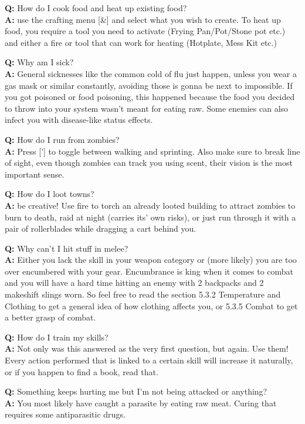 \documentclass[11pt]{report}
\begin{document}
\textbf{Q:} How do I cook food and heat up existing food?\\
\textbf{A:} use the crafting menu [\&] and select what you wish to create. To heat up food, you require a tool you need to activate (Frying Pan/Pot/Stone pot etc.) and either a fire or tool that can work for heating (Hotplate, Mess Kit etc.)

\textbf{Q:} Why am I sick?\\
\textbf{A:} General sicknesses like the common cold of flu just happen, unless you wear a gas mask or similar constantly, avoiding those is gonna be next to impossible. If you got poisoned or food poisoning, this happened because the food you decided to throw into your system wasn't meant for eating raw. Some enemies can also infect you with disease-like status effects.

\textbf{Q:} How do I run from zombies?\\
\textbf{A:} Press ['] to toggle between walking and sprinting. Also make sure to break line of sight, even though zombies can track you using scent, their vision is the most important sense.

\textbf{Q:} How do I loot towns?\\
\textbf{A:} be creative! Use fire to torch an already looted building to attract zombies to burn to death, raid at night (carries its' own risks), or just run through it with a pair of rollerblades while dragging a cart behind you.

\textbf{Q:} Why can't I hit stuff in melee?\\
\textbf{A:} Either you lack the skill in your weapon category or (more likely) you are too over encumbered with your gear. Encumbrance is king when it comes to combat and you will have a hard time hitting an enemy with 2 backpacks and 2 makeshift slings worn. So feel free to read the section 5.3.2 Temperature and Clothing to get a general idea of how clothing affects you, or 5.3.5 Combat to get a better grasp of combat.

\textbf{Q:} How do I train my skills?\\
\textbf{A:} Not only was this answered as the very first question, but again. Use them! Every action performed that is linked to a certain skill will increase it naturally, or if you happen to find a book, read that.

\textbf{Q:} Something keeps hurting me but I'm not being attacked or anything?\\
\textbf{A:} You most likely have caught a parasite by eating raw meat. Curing that requires some antiparasitic drugs.
\end{document}
